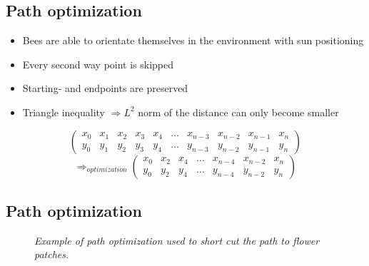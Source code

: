 \documentclass[
	paper=128mm:96mm,
	fontsize=11pt,
	pagesize,
	parskip=half-,
]{scrartcl}
\theoremstyle{mythmstyle} %
\begin{document}
\subsection*{Path optimization}
	\begin{itemize}
		\item Bees are able to orientate themselves in the environment with sun positioning \cite{seeley95}
		\item Every second way point is skipped
		\item Starting- and endpoints are preserved
		\item Triangle inequality $\Rightarrow L^2$ norm of the distance can only become smaller
	\end{itemize}
	\[
		\begin{pmatrix}
			x_0 & x_1 & x_2 & x_3 & x_4 & \ldots & x_{n-3} & x_{n-2} & x_{n-1} & x_n \\
			y_0 & y_1 & y_2 & y_3 & y_4 & \ldots & y_{n-3} & y_{n-2} & y_{n-1} & y_n
		\end{pmatrix}
	\]
	\[
		\Longrightarrow_{optimization}
		\begin{pmatrix}
			x_0 & x_2 & x_4 & \ldots & x_{n-4} & x_{n-2} & x_{n} \\ y_0 & y_2 & y_4 & \ldots & y_{n-4} & y_{n-2} & y_{n}
		\end{pmatrix}
	\]
	\clearpage

\subsection*{Path optimization}
	\begin{figure}[H]
		\centering
		\caption{\textit{Example of path optimization used to short cut the path to flower patches.}}
		\label{fig:pathOptimization}
	\end{figure}
\end{document}
